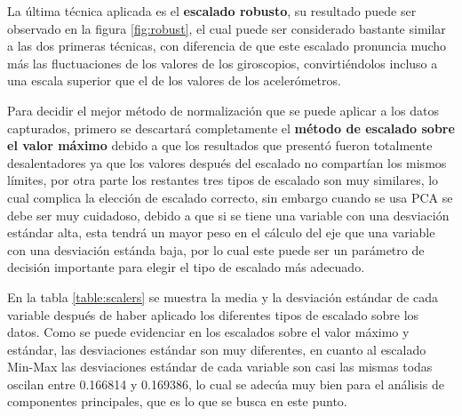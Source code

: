 La \'{u}ltima t\'{e}cnica aplicada es el \textbf{escalado robusto}, su resultado puede ser observado en la figura \ref{fig:robust}, el cual puede ser considerado bastante similar a las dos primeras t\'{e}cnicas, con diferencia de que este escalado pronuncia mucho m\'{a}s las fluctuaciones de los valores de los giroscopios, convirti\'{e}ndolos incluso a una escala superior que el de los valores de los aceler\'{o}metros.

\vspace{5mm} %

Para decidir el mejor m\'{e}todo de normalizaci\'{o}n que se puede aplicar a los datos capturados, primero se descartar\'{a} completamente el \textbf{m\'{e}todo de escalado sobre el valor m\'{a}ximo} debido a que los resultados que present\'{o} fueron totalmente desalentadores ya que los valores despu\'{e}s del escalado no compart\'{i}an los mismos l\'{i}mites, por otra parte los restantes tres tipos de escalado son muy similares, lo cual complica la elecci\'{o}n de escalado correcto, sin embargo cuando se usa PCA se debe ser muy cuidadoso, debido a que si se tiene una variable con una desviaci\'{o}n est\'{a}ndar alta, esta tendr\'{a} un mayor peso en el c\'{a}lculo del eje que una variable con una desviaci\'{o}n est\'{a}nda baja, por lo cual este puede ser un par\'{a}metro de decisi\'{o}n importante para elegir el tipo de escalado m\'{a}s adecuado.

\vspace{5mm} %

En la tabla \ref{table:scalers} se muestra la media y la desviaci\'{o}n est\'{a}ndar de cada variable despu\'{e}s de haber aplicado los diferentes tipos de escalado sobre los datos. Como se puede evidenciar en los escalados sobre el valor m\'{a}ximo y est\'{a}ndar, las desviaciones est\'{a}ndar son muy diferentes, en cuanto al escalado Min-Max las desviaciones est\'{a}ndar de cada variable son casi las mismas todas oscilan entre 0.166814 y 0.169386, lo cual se adec\'{u}a muy bien para el an\'{a}lisis de componentes principales, que es lo que se busca en este punto.


